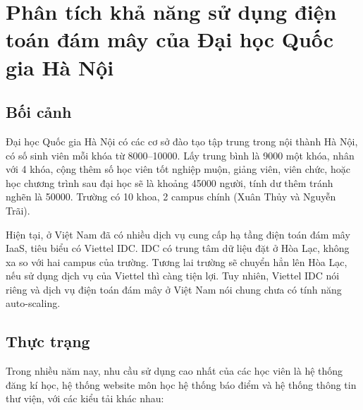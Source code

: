 \documentclass{article}
\begin{document}
\section{Phân tích khả năng sử dụng điện toán đám mây của Đại học Quốc gia Hà Nội}

\subsection{Bối cảnh}
Đại học Quốc gia Hà Nội có các cơ sở đào tạo tập trung trong nội thành Hà Nội,
có số sinh viên mỗi khóa từ 8000--10000. Lấy trung bình là 9000 một khóa, nhân
với 4 khóa, cộng thêm số học viên tốt nghiệp muộn, giảng viên, viên chức, hoặc
học chương trình sau đại học sẽ là khoảng 45000 người, tính dư thêm tránh nghẽn
là 50000. Trường có 10 khoa, 2 campus chính (Xuân Thủy và Nguyễn Trãi).

Hiện tại, ở Việt Nam đã có nhiều dịch vụ cung cấp hạ tầng điện toán đám mây
IaaS, tiêu biểu có Viettel IDC\@. IDC có trung tâm dữ liệu đặt ở Hòa Lạc, không
xa so với hai campus của trường. Tương lai trường sẽ chuyển hẳn lên Hòa Lạc, nếu
sử dụng dịch vụ của Viettel thì càng tiện lợi. Tuy nhiên, Viettel IDC nói riêng
và dịch vụ điện toán đám mây ở Việt Nam nói chung chưa có tính năng
auto-scaling.

\subsection{Thực trạng}
Trong nhiều năm nay, nhu cầu sử dụng cao nhất của các học viên là hệ thống đăng
kí học, hệ thống website môn học hệ thống báo điểm và hệ thống thông tin thư
viện, với các kiểu tải khác nhau:
\end{document}
